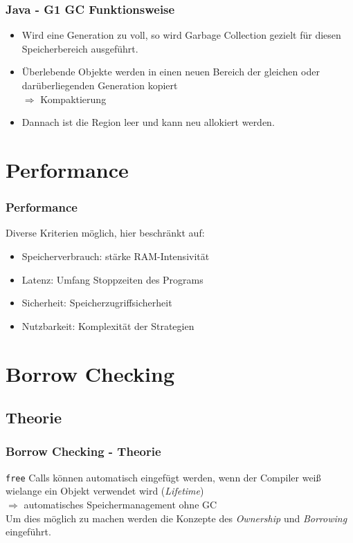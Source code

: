 \documentclass{beamer}
\begin{document}
            \begin{frame}
                \frametitle{Java - G1 GC Funktionsweise}

                \begin{itemize}
                    \item Wird eine Generation zu voll, so wird Garbage Collection gezielt für diesen Speicherbereich ausgeführt.
                    \item Überlebende Objekte werden in einen neuen Bereich der gleichen oder darüberliegenden Generation kopiert
                        \\$\Rightarrow$ Kompaktierung
                    \item Dannach ist die Region leer und kann neu allokiert werden.
                \end{itemize}
            \end{frame}

    \section{Performance}
        \begin{frame}
            \frametitle{Performance}

            Diverse Kriterien möglich, hier beschränkt auf:

            \begin{itemize}
                \item Speicherverbrauch: stärke RAM-Intensivität
                \item Latenz: Umfang Stoppzeiten des Programs
                \item Sicherheit: Speicherzugriffsicherheit
                \item Nutzbarkeit: Komplexität der Strategien
            \end{itemize}
        \end{frame}
        
    \section{Borrow Checking}

        \subsection{Theorie}
        \begin{frame}
            \frametitle{Borrow Checking - Theorie}

            \texttt{free} Calls können automatisch eingefügt werden, wenn der Compiler weiß wielange ein Objekt verwendet wird (\textit{Lifetime})\\
            $\Rightarrow$ automatisches Speichermanagement ohne GC\\
            Um dies möglich zu machen werden die Konzepte des \textit{Ownership} und \textit{Borrowing} eingeführt.
        \end{frame}
\end{document}
